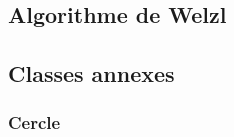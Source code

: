 \begin{Shaded}
\begin{Highlighting}[]
                     \NormalTok{()) \{}
                         
                            \NormalTok{();}
                        \NormalTok{\}}
                    \NormalTok{\}}
                \NormalTok{\}}
            \NormalTok{\}}
        \NormalTok{\}}
          \NormalTok{(-}\NormalTok{, -}\NormalTok{, -}
    \NormalTok{\}}
\NormalTok{\}}
\end{Highlighting}
\end{Shaded}

\subsection{Algorithme de Welzl}\label{algorithme-de-welzl}

\begin{Shaded}
\begin{Highlighting}[]

\end{Highlighting}
\end{Shaded}

\subsection{Classes annexes}\label{classes-annexes}

\subsubsection{Cercle}\label{cercle}

